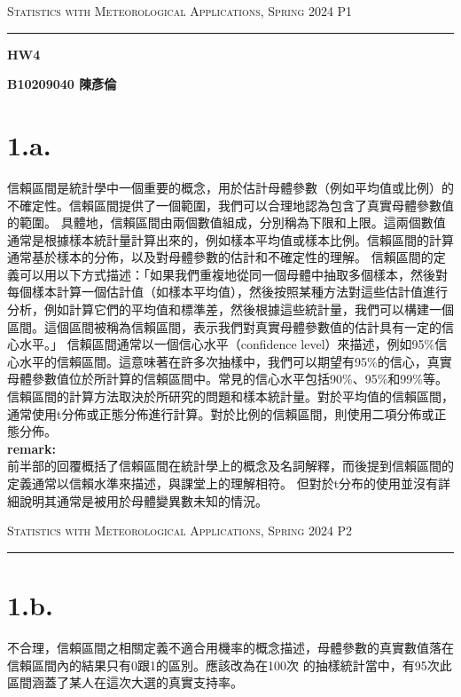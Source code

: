 \documentclass{article}
\author{B10209040 陳彥倫}
\begin{document}
\thispagestyle{empty}
\hfill {\scshape \large Statistics with Meteorological Applications, Spring 2024} \hfill {\scshape P1}
\smallskip
\hrule
\begin{CJK*}{UTF8}{bsmi}
\bigskip
\bigskip
\bigskip

\centerline{\huge \textbf {HW4}}
\bigskip
\centerline{\textbf {B10209040 陳彥倫}}

\section*{1.a.}
    \begin{spacing}{2.5}
        \begin{large}
            信賴區間是統計學中一個重要的概念，用於估計母體參數（例如平均值或比例）的不確定性。信賴區間提供了一個範圍，我們可以合理地認為包含了真實母體參數值的範圍。
            具體地，信賴區間由兩個數值組成，分別稱為下限和上限。這兩個數值通常是根據樣本統計量計算出來的，例如樣本平均值或樣本比例。信賴區間的計算通常基於樣本的分佈，以及對母體參數的估計和不確定性的理解。
            信賴區間的定義可以用以下方式描述：「如果我們重複地從同一個母體中抽取多個樣本，然後對每個樣本計算一個估計值（如樣本平均值），然後按照某種方法對這些估計值進行分析，例如計算它們的平均值和標準差，然後根據這些統計量，我們可以構建一個區間。這個區間被稱為信賴區間，表示我們對真實母體參數值的估計具有一定的信心水平。」
            信賴區間通常以一個信心水平（confidence level）來描述，例如95\%信心水平的信賴區間。這意味著在許多次抽樣中，我們可以期望有95\%的信心，真實母體參數值位於所計算的信賴區間中。常見的信心水平包括90\%、95\%和99\%等。
            信賴區間的計算方法取決於所研究的問題和樣本統計量。對於平均值的信賴區間，通常使用t分佈或正態分佈進行計算。對於比例的信賴區間，則使用二項分佈或正態分佈。\\
            \textbf{remark:}\\
            前半部的回覆概括了信賴區間在統計學上的概念及名詞解釋，而後提到信賴區間的定義通常以信賴水準來描述，與課堂上的理解相符。
            但對於t分布的使用並沒有詳細說明其通常是被用於母體變異數未知的情況。
        \end{large}
    \end{spacing}

\newpage

\thispagestyle{empty}
\hfill {\scshape \large Statistics with Meteorological Applications, Spring 2024} \hfill {\scshape P2}
\smallskip
\hrule
\bigskip
\bigskip
\bigskip

\section*{1.b.}
\begin{spacing}{2.5}
    \begin{large}
        不合理，信賴區間之相關定義不適合用機率的概念描述，母體參數的真實數值落在信賴區間內的結果只有0跟1的區別。應該改為在100次
        的抽樣統計當中，有95次此區間涵蓋了某人在這次大選的真實支持率。
    \end{large}
\end{spacing}


\end{CJK*}
\end{document}
